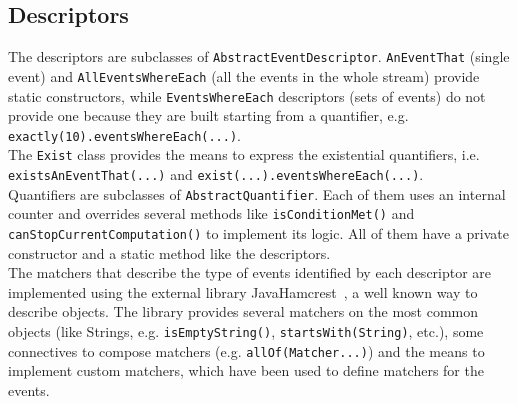 \documentclass[11pt,a4paper,notitlepage]{article}
\begin{document}
\subsection{Descriptors}
The descriptors are subclasses of \texttt{AbstractEventDescriptor}. \texttt{AnEventThat} (single event) and \texttt{AllEventsWhereEach} (all the events in the whole stream) provide static constructors, while \texttt{EventsWhereEach} descriptors (sets of events) do not provide one because they are built starting from a quantifier, e.g. \texttt{exactly(10).eventsWhereEach(...)}.\medskip \\
The \texttt{Exist} class provides the means to express the existential quantifiers, i.e. \texttt{existsAnEventThat(...)} and \texttt{exist(...).eventsWhereEach(...)}. \medskip \\
Quantifiers are subclasses of \texttt{AbstractQuantifier}. Each of them uses an internal counter and overrides several methods like \texttt{isConditionMet()} and \texttt{canStopCurrentComputation()} to implement its logic. All of them have a private constructor and a static method like the descriptors.\medskip \\
The matchers that describe the type of events identified by each descriptor are implemented using the external library JavaHamcrest~\cite{Hamcrest}, a well known way to describe objects. The library provides several matchers on the most common objects (like Strings, e.g. \texttt{isEmptyString()}, \texttt{startsWith(String)}, etc.), some connectives to compose matchers (e.g. \texttt{allOf(Matcher...)}) and the means to implement custom matchers, which have been used to define matchers for the events.
\end{document}
